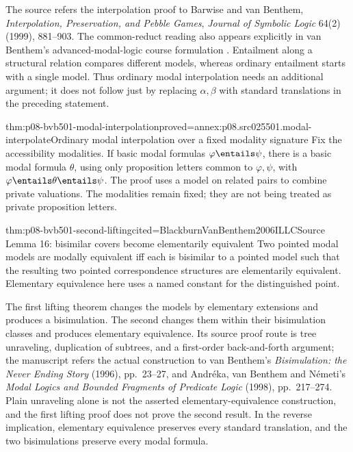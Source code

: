 The source refers the interpolation proof to Barwise and van Benthem,
\emph{Interpolation, Preservation, and Pebble Games},
\emph{Journal of Symbolic Logic} 64(2) (1999), 881--903.
The common-reduct reading also appears explicitly in van Benthem's
advanced-modal-logic course formulation \cite{VanBenthem2005AMLNotes}. Entailment along a structural
relation compares different models, whereas ordinary entailment starts
with a single model. Thus ordinary modal interpolation needs an additional
argument; it does not follow just by replacing \(\alpha,\beta\)
with standard translations in the preceding statement.

\begin{hbtheorem}{thm:p08-bvb501-modal-interpolation}{proved=annex:p08.src025501.modal-interpolate}{Ordinary modal interpolation over a fixed modality signature}
Fix the accessibility modalities. If basic modal formulas
\(\varphi\entails\psi\), there is a basic modal formula
\(\theta\), using only proposition letters common to
\(\varphi,\psi\), with \(\varphi\entails\theta\entails\psi\).
The proof uses a model on related pairs to combine private valuations.
The modalities remain fixed; they are not being treated as private
proposition letters.
\end{hbtheorem}

\begin{hbtheorem}{thm:p08-bvb501-second-lifting}{cited=BlackburnVanBenthem2006ILLC}{Source Lemma 16: bisimilar covers become elementarily equivalent}
Two pointed modal models are modally equivalent iff each is bisimilar to
a pointed model such that the resulting two pointed correspondence
structures are elementarily equivalent. Elementary equivalence here
uses a named constant for the distinguished point.
\end{hbtheorem}

The first lifting theorem changes the models by elementary extensions
and produces a bisimulation. The second changes them within their
bisimulation classes and produces elementary equivalence. Its source
proof route is tree unraveling, duplication of subtrees, and a
first-order back-and-forth argument; the manuscript refers the actual
construction to van Benthem's \emph{Bisimulation: the Never Ending Story}
(1996), pp.~23--27, and Andr\'eka, van Benthem and N\'emeti's
\emph{Modal Logics and Bounded Fragments of Predicate Logic}
(1998), pp.~217--274. Plain unraveling alone is not the asserted
elementary-equivalence construction, and the first lifting proof does
not prove the second result. In the reverse implication, elementary
equivalence preserves every standard translation, and the two
bisimulations preserve every modal formula.

